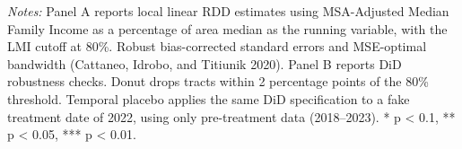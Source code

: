 \begin{table}[htbp]
\centering
\caption{Robustness: RDD at the 80\% Income Threshold (2024 Cross-Section)}
\label{tab:rdd}
\begin{threeparttable}
\begin{tablenotes}[flushleft]
\small
\item \textit{Notes:} Panel A reports local linear RDD estimates using MSA-Adjusted Median Family Income as a percentage of area median as the running variable, with the LMI cutoff at 80\%. Robust bias-corrected standard errors and MSE-optimal bandwidth (Cattaneo, Idrobo, and Titiunik 2020). Panel B reports DiD robustness checks. Donut drops tracts within 2 percentage points of the 80\% threshold. Temporal placebo applies the same DiD specification to a fake treatment date of 2022, using only pre-treatment data (2018--2023). * p < 0.1, ** p < 0.05, *** p < 0.01.
\end{tablenotes}
\end{threeparttable}
\end{table}
